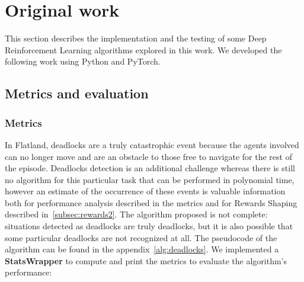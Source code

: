 \documentclass[11pt, a4paper, hidelinks]{report}
\begin{document}
\chapter{Original work}\label{ch:original-work}

This section describes the implementation and the testing of some Deep Reinforcement Learning algorithms explored in this work.
We developed the following work using Python and PyTorch.

\section{Metrics and evaluation}\label{sec:metrics-and-evaluation}

\subsection{Metrics}\label{subsec:metrics}

In Flatland, deadlocks are a truly catastrophic event because the agents involved can no longer move and are an obstacle to those free to navigate for the rest of the episode.
Deadlocks detection is an additional challenge whereas there is still no algorithm for this particular task that can be performed in polynomial time, however an estimate of the occurrence of these events is valuable information both for performance analysis described in the metrics and for Rewards Shaping described in~\ref{subsec:rewards2}.
The algorithm proposed is not complete: situations detected as deadlocks are truly deadlocks, but it is also possible that some particular deadlocks are not recognized at all.
The pseudocode of the algorithm can be found in the appendix~\ref{alg:deadlocks}.
We implemented a \textbf{StatsWrapper} to compute and print the metrics to evaluate the algorithm's performance:
\end{document}
